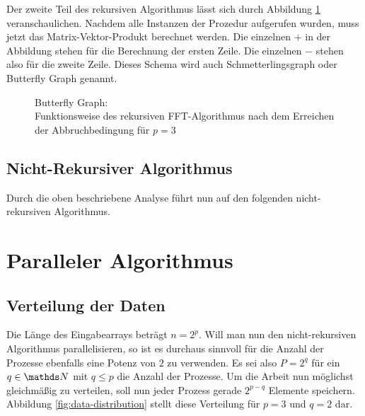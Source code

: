 			Der zweite Teil des rekursiven Algorithmus lässt sich durch Abbildung \ref{fig:butterfly} veranschaulichen.
			Nachdem alle Instanzen der Prozedur aufgerufen wurden, muss jetzt das Matrix-Vektor-Produkt berechnet werden.
			Die einzelnen $+$ in der Abbildung stehen für die Berechnung der ersten Zeile.
			Die einzelnen $-$ stehen also für die zweite Zeile.
			Dieses Schema wird auch Schmetterlingsgraph oder Butterfly Graph genannt.

			\begin{figure}[p]
				\center
				
				\caption{Butterfly Graph: \\ Funktionsweise des rekursiven FFT-Algorithmus nach dem Erreichen der Abbruchbedingung für $p=3$}
				\label{fig:butterfly}
			\end{figure}


		\newpage

		\subsection{Nicht-Rekursiver Algorithmus} %
		\label{sub:nicht_rekursiver_algorithmus}
		
			Durch die oben beschriebene Analyse führt nun auf den folgenden nicht-rekursiven Algorithmus.

			\begin{tcolorbox}[colframe=black,colbacktitle=white,coltitle=black, attach boxed title to top center={yshift=-2mm},enhanced, titlerule=0.1pt, boxrule=0.5pt, arc=5pt,title=Listing:\quad nicht-rekursiver FFT-Algorithmus]
				
			\end{tcolorbox}



	\section{Paralleler Algorithmus} %
	\label{sec:paralleler_algorithmus}
	
		\subsection{Verteilung der Daten} %
		\label{sub:verteilung_der_daten}

			Die Länge des Eingabearrays beträgt $n=2^p$.
			Will man nun den nicht-rekursiven Algorithmus parallelisieren, so ist es durchaus sinnvoll für die Anzahl der Prozesse ebenfalls eine Potenz von $2$ zu verwenden.
			Es sei also $P=2^q$ für ein $q\in\SN$ mit $q\leq p$ die Anzahl der Prozesse.
			Um die Arbeit nun möglichst gleichmäßig zu verteilen, soll nun jeder Prozess gerade $2^{p-q}$ Elemente speichern.
			Abbildung \ref{fig:data-distribution} stellt diese Verteilung für $p=3$ und $q=2$ dar.

